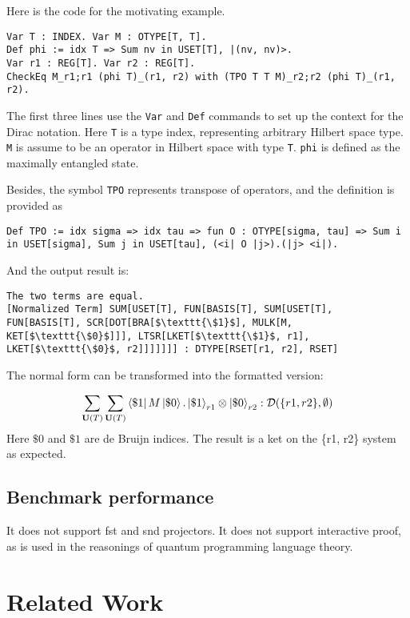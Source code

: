 \documentclass[runningheads]{llncs}
\begin{document}
Here is the code for the motivating example.

    \begin{lstlisting}[style=dirace]
Var T : INDEX. Var M : OTYPE[T, T].
Def phi := idx T => Sum nv in USET[T], |(nv, nv)>.
Var r1 : REG[T]. Var r2 : REG[T].
CheckEq M_r1;r1 (phi T)_(r1, r2) with (TPO T T M)_r2;r2 (phi T)_(r1, r2).
    \end{lstlisting}        

The first three lines use the \texttt{Var} and \texttt{Def} commands to set up the context for the Dirac notation.
Here \texttt{T} is a type index, representing arbitrary Hilbert space type. \texttt{M} is assume to be an operator in Hilbert space with type \texttt{T}. \texttt{phi} is defined as the maximally entangled state.

Besides, the symbol \texttt{TPO} represents transpose of operators, and the definition is provided as
\begin{lstlisting}[style=dirace]
Def TPO := idx sigma => idx tau => fun O : OTYPE[sigma, tau] => Sum i in USET[sigma], Sum j in USET[tau], (<i| O |j>).(|j> <i|).
\end{lstlisting}


And the output result is:
    \begin{lstlisting}[style=dirace]
The two terms are equal.
[Normalized Term] SUM[USET[T], FUN[BASIS[T], SUM[USET[T], FUN[BASIS[T], SCR[DOT[BRA[$\texttt{\$1}$], MULK[M, KET[$\texttt{\$0}$]]], LTSR[LKET[$\texttt{\$1}$, r1], LKET[$\texttt{\$0}$, r2]]]]]]] : DTYPE[RSET[r1, r2], RSET]
    \end{lstlisting}

The normal form can be transformed into the formatted version:

\[
\sum_{\mathbf{U}(T)} \sum_{\mathbf{U}(T)} \bra{\$1}M\ket{\$ 0} . \ket{\$1}_{r1} \otimes \ket{\$0}_{r2} : \mathcal{D}(\{r1, r2\}, \emptyset)
\]
Here $\$0$ and $\$1$ are de Bruijn indices. The result is a ket on the \{r1, r2\} system as expected.

\subsection{Benchmark performance}
It does not support fst and snd projectors.
It does not support interactive proof, as is used in the reasonings of quantum programming language theory.




\section{Related Work}
\end{document}
